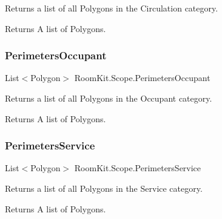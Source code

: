 Returns a list of all Polygons in the Circulation category. 

\begin{DoxyReturn}{Returns}
A list of Polygons. 
\end{DoxyReturn}
\mbox{\label{class_room_kit_1_1_scope_ac7fcbc419e0f7b4242e38c69b96ae28f}} 
\subsubsection{\texorpdfstring{Perimeters\+Occupant}{PerimetersOccupant}}
{\footnotesize\ttfamily List$<$Polygon$>$ Room\+Kit.\+Scope.\+Perimeters\+Occupant\hspace{0.3cm}{\ttfamily [get]}}



Returns a list of all Polygons in the Occupant category. 

\begin{DoxyReturn}{Returns}
A list of Polygons. 
\end{DoxyReturn}
\mbox{\label{class_room_kit_1_1_scope_a16f2c7376beddabff7a1e5f664faa12f}} 
\subsubsection{\texorpdfstring{Perimeters\+Service}{PerimetersService}}
{\footnotesize\ttfamily List$<$Polygon$>$ Room\+Kit.\+Scope.\+Perimeters\+Service\hspace{0.3cm}{\ttfamily [get]}}



Returns a list of all Polygons in the Service category. 

\begin{DoxyReturn}{Returns}
A list of Polygons. 
\end{DoxyReturn}
\mbox{\label{class_room_kit_1_1_scope_a529c86de463bfe3ec9eb868778c161db}} 
